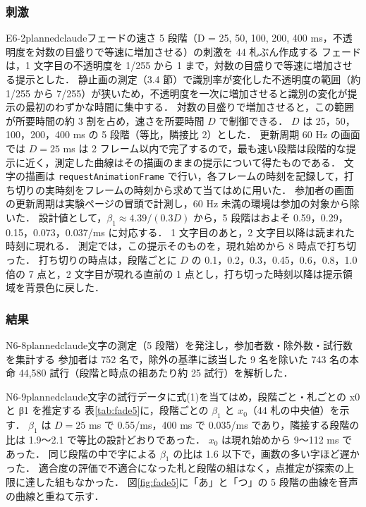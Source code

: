 \subsubsection{刺激}
\begin{fd}{E6-2}{planned}{claude}{フェードの速さ 5 段階（D = 25, 50, 100, 200, 400 ms，不透明度を対数の目盛りで等速に増加させる）の刺激を 44 札ぶん作成する}
フェードは，1 文字目の不透明度を 1/255 から 1 まで，対数の目盛りで等速に増加させる提示とした．
静止画の測定（3.4 節）で識別率が変化した不透明度の範囲（約 1/255 から 7/255）が狭いため，不透明度を一次に増加させると識別の変化が提示の最初のわずかな時間に集中する．
対数の目盛りで増加させると，この範囲が所要時間の約 3 割を占め，速さを所要時間 $D$ で制御できる．
$D$ は 25，50，100，200，400 ms の 5 段階（等比，隣接比 2）とした．
更新周期 60 Hz の画面では $D = 25$ ms は 2 フレーム以内で完了するので，最も速い段階は段階的な提示に近く，測定した曲線はその描画のままの提示について得たものである．
文字の描画は \texttt{requestAnimationFrame} で行い，各フレームの時刻を記録して，打ち切りの実時刻をフレームの時刻から求めて当てはめに用いた．
参加者の画面の更新周期は実験ページの冒頭で計測し，60 Hz 未満の環境は参加の対象から除いた．
設計値として，$\beta_1 \approx 4.39/(0.3 D)$ から，5 段階はおよそ 0.59，0.29，0.15，0.073，0.037/ms に対応する．
1 文字目のあと，2 文字目以降は読まれた時刻に現れる．
測定では，この提示そのものを，現れ始めから 8 時点で打ち切った．
打ち切りの時点は，段階ごとに $D$ の 0.1，0.2，0.3，0.45，0.6，0.8，1.0 倍の 7 点と，2 文字目が現れる直前の 1 点とし，打ち切った時刻以降は提示領域を背景色に戻した．
\end{fd}

\subsubsection{結果}
\begin{fd}{N6-8}{planned}{claude}{文字の測定（5 段階）を発注し，参加者数・除外数・試行数を集計する}
参加者は 752 名で，除外の基準に該当した 9 名を除いた 743 名の本命 44,580 試行（段階と時点の組あたり約 25 試行）を解析した．
\end{fd}

\begin{fd}{N6-9}{planned}{claude}{文字の試行データに式(1)を当てはめ，段階ごと・札ごとの x0 と β1 を推定する}
表\ref{tab:fade5}に，段階ごとの $\beta_1$ と $x_0$（44 札の中央値）を示す．
$\beta_1$ は $D = 25$ ms で 0.55/ms，400 ms で 0.035/ms であり，隣接する段階の比は 1.9〜2.1 で等比の設計どおりであった．
$x_0$ は現れ始めから 9〜112 ms であった．
同じ段階の中で字による $\beta_1$ の比は 1.6 以下で，画数の多い字ほど遅かった．
適合度の評価で不適合になった札と段階の組はなく，点推定が探索の上限に達した組もなかった．
図\ref{fig:fade5}に「あ」と「つ」の 5 段階の曲線を音声の曲線と重ねて示す．
\end{fd}

